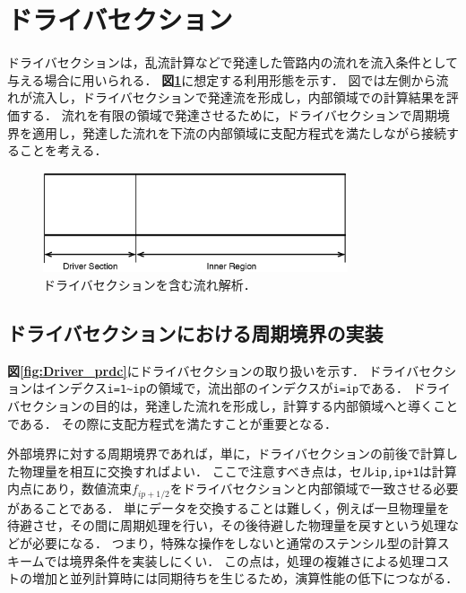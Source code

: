 \graphicspath{{./fig_Driver/}}
%

%
\section{ドライバセクション}
ドライバセクションは，乱流計算などで発達した管路内の流れを流入条件として与える場合に用いられる．
\textbf{図\ref{fig:Driver}}に想定する利用形態を示す．
図では左側から流れが流入し，ドライバセクションで発達流を形成し，内部領域での計算結果を評価する．
流れを有限の領域で発達させるために，ドライバセクションで周期境界を適用し，発達した流れを下流の内部領域に支配方程式を満たしながら接続することを考える．

\begin{figure}[htbp]
\begin{center}
\includegraphics[width=9cm,clip]{Driver.eps}
\end{center}
\caption{ドライバセクションを含む流れ解析．}
\label{fig:Driver}
\end{figure}

%
\subsection{ドライバセクションにおける周期境界の実装}

\textbf{図\ref{fig:Driver_prdc}}にドライバセクションの取り扱いを示す．
ドライバセクションはインデクス\verb|i=1~ip|の領域で，流出部のインデクスが\verb|i=ip|である．
ドライバセクションの目的は，発達した流れを形成し，計算する内部領域へと導くことである．
その際に支配方程式を満たすことが重要となる．

外部境界に対する周期境界であれば，単に，ドライバセクションの前後で計算した物理量を相互に交換すればよい．
ここで注意すべき点は，セル\verb|ip,ip+1|は計算内点にあり，数値流束$f_{ip+1/2}$をドライバセクションと内部領域で一致させる必要があることである．
単にデータを交換することは難しく，例えば一旦物理量を待避させ，その間に周期処理を行い，その後待避した物理量を戻すという処理などが必要になる．
つまり，特殊な操作をしないと通常のステンシル型の計算スキームでは境界条件を実装しにくい．
この点は，処理の複雑さによる処理コストの増加と並列計算時には同期待ちを生じるため，演算性能の低下につながる．

